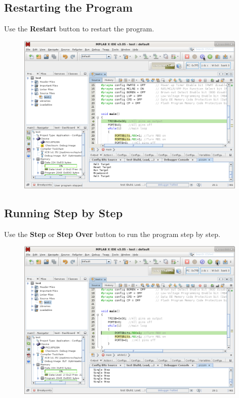 \subsection{Restarting the Program}
Use the \textbf{Restart} button to restart the program.
\begin{figure}[H]
\center
\includegraphics[width=0.98\textwidth]{img/hmd/mplab27.png} 
\end{figure} 

\subsection{Running Step by Step}
Use the \textbf{Step} or \textbf{Step Over} button to run the program step by step.
\begin{figure}[H]
\center
\includegraphics[width=0.98\textwidth]{img/hmd/mplab28.png} 
\end{figure} 

